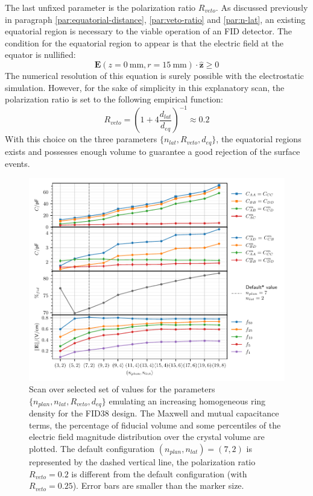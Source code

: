 The last unfixed parameter is the polarization ratio $R_{veto}$. As discussed previously in paragraph \ref{par:equatorial-distance}, \ref{par:veto-ratio} and \ref{par:n-lat}, an existing equatorial region is necessary to the viable operation of an FID detector. The condition for the equatorial region to appear is that the electric field at the equator is nullified:
\begin{equation}
\bm{E}\left(z=\SI{0}{\mm}, r=\SI{15}{\mm} \right) \cdot \hat{\bm{z}} \geq 0
\end{equation}
The numerical resolution of this equation is surely possible with the electrostatic simulation. However, for the sake of simplicity in this explanatory scan, the polarization ratio is set to the following empirical function:
\begin{equation}
R_{veto} = \left(1 + 4 \frac{d_{lat}}{d_{eq}} \right)^{-1} \approx 0.2
\end{equation}
With this choice on the three parameters $\{n_{lat}, R_{veto}, d_{eq}\}$, the equatorial regions exists and possesses enough volume to guarantee a good rejection of the surface events.

\begin{figure}
\centering
\includegraphics[scale=1]{Figures/ElectrodesScan/capacitance_fiducial_global_scale.pdf}
\caption{Scan over selected set of values for the parameters $\{n_{plan}, n_{lat}, R_{veto}, d_{eq}\}$ emulating an increasing homogeneous ring density for the FID38 design. The Maxwell and mutual capacitance terms, the percentage of fiducial volume and some percentiles of the electric field magnitude distribution over the crystal volume are plotted. The default configuration $(n_{plan}, n_{lat})=(7,2)$ is represented by the dashed vertical line, the polarization ratio $R_{veto}=0.2$ is different from the default configuration (with $R_{veto}=0.25$). Error bars are smaller than the marker size.}
\label{fig:capacitance-fiducial-global-scale}
\end{figure}

